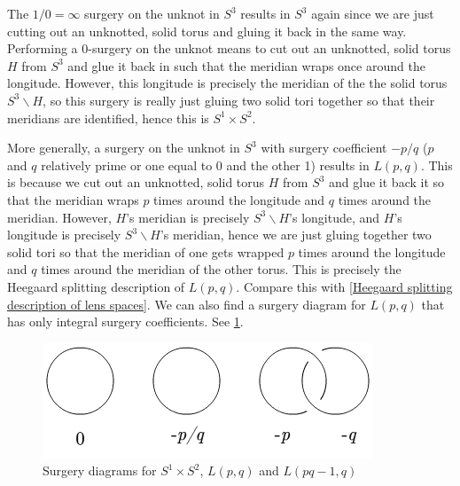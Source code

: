 \begin{example}
The $1/0=\infty$ surgery on the unknot in $S^3$ results in $S^3$ again since we are just cutting out an unknotted, solid torus and gluing it back in the same way. Performing a 0-surgery on the unknot means to cut out an unknotted, solid torus $H$ from $S^3$ and glue it back in such that the meridian wraps once around the longitude. However, this longitude is precisely the meridian of the the solid torus $S^3 \backslash H$, so this surgery is really just gluing two solid tori together so that their meridians are identified, hence this is $S^1 \times S^2$. 

More generally, a surgery on the unknot in $S^3$ with surgery coefficient $-p/q$ ($p$ and $q$ relatively prime or one equal to 0 and the other 1) results in $L(p,q)$. This is because we cut out an unknotted, solid torus $H$ from $S^3$ and glue it back it so that the meridian wraps $p$ times around the longitude and $q$ times around the meridian. However, $H$'s meridian is precisely $S^3 \backslash H$'s longitude, and $H$'s longitude is precisely $S^3 \backslash H$'s meridian, hence we are just gluing together two solid tori so that the meridian of one gets wrapped $p$ times around the longitude and $q$ times around the meridian of the other torus. This is precisely the Heegaard splitting description of $L(p,q)$. Compare this with \cref{Heegaard splitting description of lens spaces}. We can also find a surgery diagram for $L(p,q)$ that has only integral surgery coefficients. See \cref{surgery-s1xs2-lpq}. 

\begin{figure}[tb]
\centering
\includegraphics[scale=.6]{graphics/surgery-s1xs2-l(p,q)}
\caption{Surgery diagrams for $S^1 \times S^2$, $L(p,q)$ and $L(pq-1,q)$}
\label{surgery-s1xs2-lpq}
\end{figure}
\end{example}


